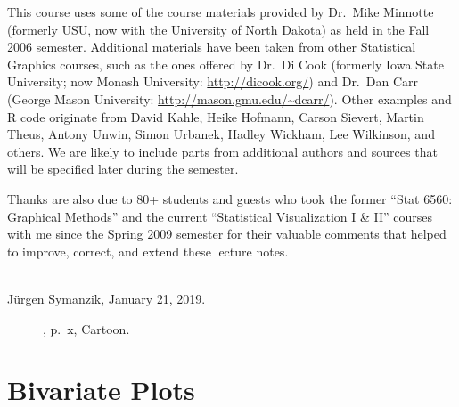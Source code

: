 \documentclass[12pt,letterpaper,final]{article}
\begin{document}
This course uses some of the course materials provided by
Dr.\ Mike Minnotte (formerly USU, now with the University of
North Dakota) as held in the Fall 2006 semester. Additional materials
have been taken from other Statistical Graphics courses, such as the
ones offered by Dr.\ Di Cook (formerly Iowa State University; now Monash University:
\url{http://dicook.org/}) and
Dr.\ Dan Carr (George Mason University: \url{http://mason.gmu.edu/~dcarr/}).
Other examples and R code originate from 
David Kahle, Heike Hofmann, Carson Sievert,
Martin Theus, Antony Unwin, Simon Urbanek, Hadley Wickham, Lee Wilkinson, and others.
We are likely to include parts from additional authors and sources
that will be specified later during the semester.

Thanks are also due to 80+ students and guests who took 
the former ``Stat 6560: Graphical Methods'' and
the current ``Statistical Visualization I \& II'' courses
with me since the Spring 2009 semester 
for their valuable comments that helped
to improve, correct, and extend these lecture notes.


~\\
J\"urgen Symanzik, January 21, 2019.


\begin{figure}[ht]
\caption{\label{Zelazny_px_Fig}
\cite{Ze2001}, p.~x, Cartoon.
}
\end{figure}

\newpage

%
{}

\newpage


\setcounter{page}{1}



\def\jsprivatechsix{1} %


\section{Bivariate Plots}

\end{document}
